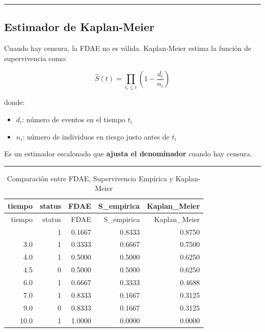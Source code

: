 \documentclass[
]{article}
\providecommand{\tightlist}{%
  \setlength{\itemsep}{0pt}\setlength{\parskip}{0pt}}
\begin{document}
\begin{center}\rule{0.5\linewidth}{0.5pt}\end{center}

\subsection{Estimador de Kaplan-Meier}\label{estimador-de-kaplan-meier}

Cuando hay censura, la FDAE no es válida. Kaplan-Meier estima la función
de supervivencia como:

\[
\hat{S}(t) = \prod_{t_i \leq t} \left(1 - \frac{d_i}{n_i} \right)
\]

donde:

\begin{itemize}
\tightlist
\item
  \(d_i\): número de eventos en el tiempo \(t_i\)
\item
  \(n_i\): número de individuos en riesgo justo antes de \(t_i\)
\end{itemize}

Es un estimador escalonado que \textbf{ajusta el denominador} cuando hay
censura.

\begin{center}\rule{0.5\linewidth}{0.5pt}\end{center}

\begin{longtable}[]{@{}rrrrr@{}}
\caption{Comparación entre FDAE, Supervivencia Empírica y
Kaplan-Meier}\tabularnewline
\toprule\noalign{}
tiempo & status & FDAE & S\_empirica & Kaplan\_Meier \\
\midrule\noalign{}
\endfirsthead
\toprule\noalign{}
tiempo & status & FDAE & S\_empirica & Kaplan\_Meier \\
\midrule\noalign{}
\endhead
\bottomrule\noalign{}
\endlastfoot
2.0 & 1 & 0.1667 & 0.8333 & 0.8750 \\
3.0 & 1 & 0.3333 & 0.6667 & 0.7500 \\
4.0 & 1 & 0.5000 & 0.5000 & 0.6250 \\
4.5 & 0 & 0.5000 & 0.5000 & 0.6250 \\
6.0 & 1 & 0.6667 & 0.3333 & 0.4688 \\
7.0 & 1 & 0.8333 & 0.1667 & 0.3125 \\
9.0 & 0 & 0.8333 & 0.1667 & 0.3125 \\
10.0 & 1 & 1.0000 & 0.0000 & 0.0000 \\
\end{longtable}
\end{document}
